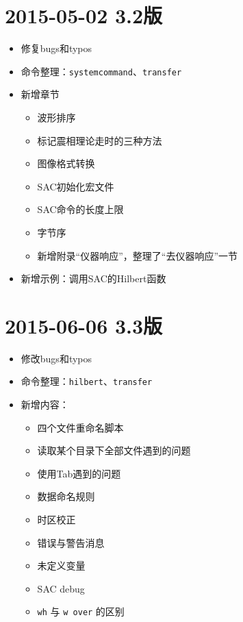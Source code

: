 \section*{2015-05-02 3.2版}
\begin{itemize}
\item 修复bugs和typos
\item 命令整理：\texttt{systemcommand}、\texttt{transfer}
\item 新增章节
    \begin{itemize}
    \item 波形排序
    \item 标记震相理论走时的三种方法
    \item 图像格式转换
    \item SAC初始化宏文件
    \item SAC命令的长度上限
    \item 字节序
    \item 新增附录``仪器响应''，整理了``去仪器响应''一节
    \end{itemize}
\item 新增示例：调用SAC的Hilbert函数
\end{itemize}

\section*{2015-06-06 3.3版}
\begin{itemize}
\item 修改bugs和typos
\item 命令整理：\texttt{hilbert}、\texttt{transfer}
\item 新增内容：
    \begin{itemize}
    \item 四个文件重命名脚本
    \item 读取某个目录下全部文件遇到的问题
    \item 使用Tab遇到的问题
    \item 数据命名规则
    \item 时区校正
    \item 错误与警告消息
    \item 未定义变量
    \item SAC debug
    \item \texttt{wh} 与 \texttt{w over} 的区别
    \end{itemize}
\end{itemize}


